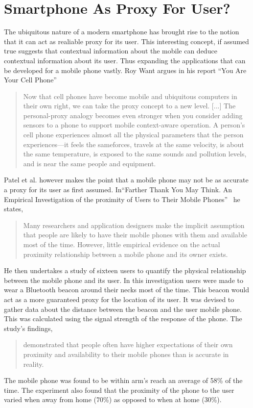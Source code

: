 \section{Smartphone As Proxy For User?} %
\label{sec:section_proxy}
The ubiquitous nature of a modern smartphone has brought rise to the notion that it can act as realiable proxy for its user.  This interesting concept, if assumed true suggests that contextual information about the mobile can deduce contextual information about its user. Thus expanding the applications that can be developed for a mobile phone vastly. Roy Want argues in his report ``You Are Your Cell Phone''~\cite{want2008cellphone}
\begin{quote}
Now that cell phones have become mobile and ubiquitous computers in their own right, we can take the proxy concept to a new  level. [...] The personal-proxy analogy becomes even stronger when you consider adding sensors to a phone to support mobile  context-aware operation. A person’s cell phone experiences almost all the physical parameters that the person experiences—it    feels the sameforces, travels at the same velocity, is about the same temperature, is exposed to the same sounds and pollution levels, and is near the same people and equipment.
\end{quote}
Patel et al. however makes the point that a mobile phone may not be as accurate a proxy for its user as first assumed.  In``Farther Thank You May Think. An Empirical Investigation of the proximity of Users to Their Mobile Phones''~\cite{patel2006farther} he states, 
\begin{quote}
Many researchers and application designers make the implicit assumption that people are likely to have their mobile phones with them and available most of the time. However, little empirical evidence on the actual proximity relationship between a mobile phone and its owner exists.
\end{quote}
He then undertakes a study of sixteen users to quantify the physical relationship between the mobile phone and its user. In this investigation users were made to wear a Bluetooth beacon around their necks most of the time. This beacon would act as a more guaranteed proxy for the location of its user. It was devised to gather data about the distance between the beacon and the user mobile phone. This was calculated using the signal strength of the response of the phone. The study’s findings,
\begin{quote}
demonstrated that people often have higher expectations of their own proximity and availability to their mobile phones than is accurate in reality.
\end{quote}
The mobile phone was found to be within arm’s reach an average of 58\% of the
time. The experiment also found that the proximity of the phone to the user varied when away from home (70\%) as opposed to when at home (30\%).


